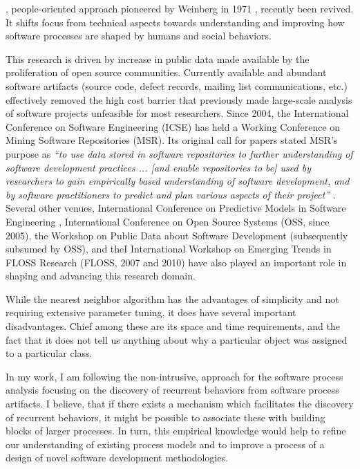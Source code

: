 , people-oriented approach 
pioneered by Weinberg in 1971 \cite{citeulike:262020}, 
recently been revived.  It shifts focus from technical aspects towards understanding and improving how software 
processes are shaped by humans and social behaviors. 

This research is driven by increase in public data made available by the proliferation 
of open source communities. Currently available and abundant software artifacts (source code, defect records, 
mailing list communications, etc.) effectively removed the high cost barrier that previously made large-scale analysis of software 
projects unfeasible for most researchers. Since 2004, the International Conference on Software Engineering (ICSE) has 
held a Working Conference on Mining Software Repositories (MSR). 
Its original call for papers stated MSR's purpose as \textit{``to use data stored in software
repositories to further understanding of software development practices ... [and enable
repositories to be] used by researchers to gain empirically based understanding of software
development, and by software practitioners to predict and plan various aspects of their
project''} \cite{citeulike:7853299}. 
Several other venues, 
International Conference on Predictive Models in Software Engineering , 
International Conference on Open Source Systems (OSS, since 2005), 
the Workshop on Public Data about Software Development (subsequently subsumed by OSS), 
and theI International Workshop on Emerging Trends in FLOSS Research (FLOSS, 2007 and 2010) have also played
an important role in shaping and advancing this research domain.

While the nearest neighbor algorithm has the advantages of simplicity and not
requiring extensive parameter tuning, it does have several
important disadvantages. Chief among these are its space and time
requirements, and the fact that it does not tell us anything about
why a particular object was assigned to a particular class.

In my work, I am following the non-intrusive, approach for the software process analysis focusing on the discovery 
of recurrent behaviors from software process artifacts. I believe, that if there exists a mechanism which facilitates 
the discovery of recurrent behaviors, it might be possible to associate these with building blocks of larger processes. 
In turn, this empirical knowledge would help to refine our understanding of existing process models and to improve 
a process of a design of novel software development methodologies.

